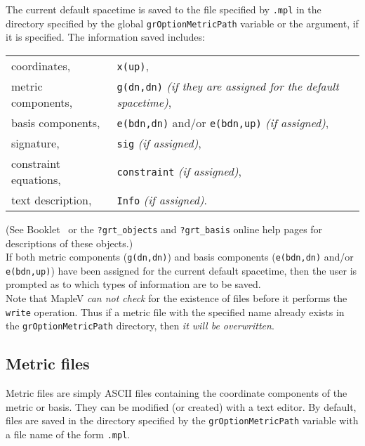 \documentclass{article}
\begin{document}
The current default spacetime is saved to the file specified by
\texttt{.mpl} in the directory specified by the global
\texttt{grOptionMetricPath} variable or the 
argument, if it is specified.  The information saved includes:
\begin{center}
  \begin{tabular}{ll}
    coordinates, & \texttt{x(up)}, \\
    metric components, & \texttt{g(dn,dn)} \textit{(if they are assigned for
      the default spacetime)},\\
    basis components, & \texttt{e(bdn,dn)} and/or \texttt{e(bdn,up)}
      \textit{(if assigned)},\\
    signature, & \texttt{sig} \textit{(if assigned)}, \\
    constraint equations, & \texttt{constraint} \textit{(if assigned)}, \\
    text description, &  \texttt{Info} \textit{(if assigned)}.\\
  \end{tabular}
\end{center}
(See Booklet \grCalcRef~or the \texttt{?grt\_objects} and
\texttt{?grt\_basis} online help pages for descriptions of these
objects.)\\

If both metric components (\texttt{g(dn,dn)}) and basis components
(\texttt{e(bdn,dn)} and/or \texttt{e(bdn,up)}) have been assigned for
the current default spacetime, then the user is prompted as to which
types of information are to be saved.\\

Note that MapleV \textit{can not check} for the existence of files before
it performs the \texttt{write} operation. Thus if a metric file with the
specified name already exists in the \texttt{grOptionMetricPath} directory,
then \textit{it will be overwritten}.
%
\subsection{Metric files} \label{sec:metricfiles}
%
Metric files are simply ASCII files containing the coordinate
components of the metric or basis. They can be modified (or created)
with a text editor. By default, files are saved in
the directory specified by the \texttt{grOptionMetricPath} variable
with a file name of the form \texttt{.mpl}.\\
\end{document}

